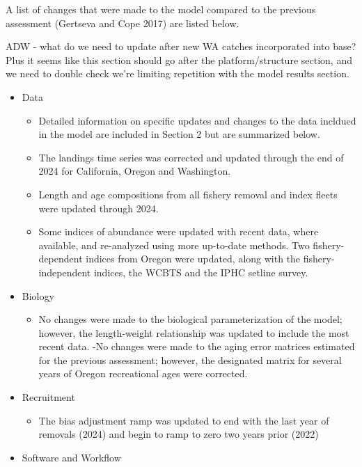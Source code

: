 \documentclass[
]{scrartcl}
\providecommand{\tightlist}{%
  \setlength{\itemsep}{0pt}\setlength{\parskip}{0pt}}\usepackage{longtable,booktabs,array}
\begin{document}
A list of changes that were made to the model compared to the previous
assessment (Gertseva and Cope 2017) are listed below.

ADW - what do we need to update after new WA catches incorporated into
base? Plus it seems like this section should go after the
platform/structure section, and we need to double check we're limiting
repetition with the model results section.

\begin{itemize}
\tightlist
\item
  Data

  \begin{itemize}
  \tightlist
  \item
    Detailed information on specific updates and changes to the data
    incldued in the model are included in Section 2 but are summarized
    below.
  \item
    The landings time series was corrected and updated through the end
    of 2024 for California, Oregon and Washington.
  \item
    Length and age compositions from all fishery removal and index
    fleets were updated through 2024.
  \item
    Some indices of abundance were updated with recent data, where
    available, and re-analyzed using more up-to-date methods. Two
    fishery-dependent indices from Oregon were updated, along with the
    fishery-independent indices, the WCBTS and the IPHC setline survey.
  \end{itemize}
\item
  Biology

  \begin{itemize}
  \tightlist
  \item
    No changes were made to the biological parameterization of the
    model; however, the length-weight relationship was updated to
    include the most recent data. -No changes were made to the aging
    error matrices estimated for the previous assessment; however, the
    designated matrix for several years of Oregon recreational ages were
    corrected.
  \end{itemize}
\item
  Recruitment

  \begin{itemize}
  \tightlist
  \item
    The bias adjustment ramp was updated to end with the last year of
    removals (2024) and begin to ramp to zero two years prior (2022)
  \end{itemize}
\item
  Software and Workflow


\end{itemize}
\end{document}
